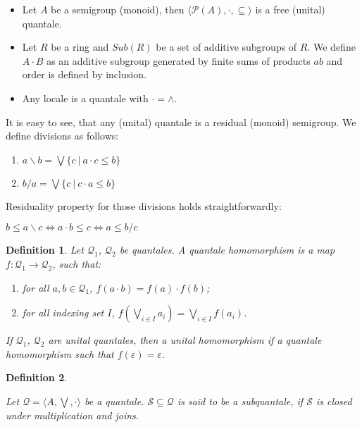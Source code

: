 \documentclass[a4paper]{article}
\theoremstyle{defin}
\newtheorem{defin}{Definition}
\theoremstyle{theorem}
\theoremstyle{prop}
\theoremstyle{lemma}
\theoremstyle{ex}
\theoremstyle{col}
\begin{document}
\begin{itemize}
\item Let $A$ be a semigroup (monoid), then $\langle \mathcal{P}(A), \cdot, \subseteq \rangle$
is a free (unital) quantale.
\item Let $R$ be a ring and $Sub(R)$ be a set of additive subgroups of $R$.
We define $A \cdot B$ as an additive subgroup generated by finite sums of products $ab$ and order is defined by inclusion.
\item Any locale is a quantale with $\cdot = \wedge$.
\end{itemize}

It is easy to see, that any (unital) quantale is a residual (monoid) semigroup. We define divisions as follows:

\begin{enumerate}
\item $a \backslash b = \bigvee \{ c \: | \: a \cdot c \leq b \}$
\item $b / a = \bigvee \{ c \: | \: c \cdot a \leq b \}$
\end{enumerate}

Residuality property for those divisions holds straightforwardly:

\begin{center}
  $b \leq a \backslash c \Leftrightarrow a \cdot b \leq c \Leftrightarrow a \leq b / c$
\end{center}

\begin{defin}

  Let $\mathcal{Q}_1$, $\mathcal{Q}_2$ be quantales. A quantale homomorphism is a map $f : \mathcal{Q}_1 \to \mathcal{Q}_2$, such that:

  \begin{enumerate}
    \item for all $a,b \in \mathcal{Q}_1$, $f(a \cdot b) = f(a) \cdot f(b)$;
    \item for all indexing set $I$, $f(\bigvee \limits_{i \in I} a_i) = \bigvee \limits_{i \in I} f(a_i)$.
  \end{enumerate}

  If $\mathcal{Q}_1$, $\mathcal{Q}_2$ are unital quantales, then a unital homomorphism if a quantale homomorphism such that $f(\varepsilon) = \varepsilon$.
\end{defin}

\begin{defin}
$ $

  Let $\mathcal{Q} = \langle A, \bigvee, \cdot \rangle$ be a quantale. $\mathcal{S} \subseteq \mathcal{Q}$ is said to be a subquantale, if $\mathcal{S}$ is closed under multiplication and joins.
\end{defin}
\end{document}
